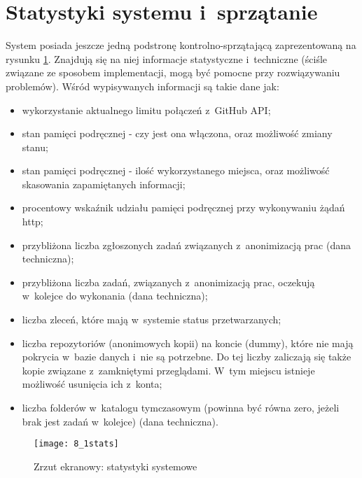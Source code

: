 \section{Statystyki systemu i~sprzątanie}
System posiada jeszcze jedną podstronę kontrolno-sprzątającą zaprezentowaną na rysunku \ref{obr81}. Znajdują się na niej informacje statystyczne i~techniczne (ściśle związane ze sposobem implementacji, mogą być pomocne przy rozwiązywaniu problemów). Wśród wypisywanych informacji są takie dane jak:
\begin{itemize}
    \item wykorzystanie aktualnego limitu połączeń z~GitHub API;
    \item stan pamięci podręcznej - czy jest ona włączona, oraz możliwość zmiany stanu;
    \item stan pamięci podręcznej - ilość wykorzystanego miejsca, oraz możliwość skasowania zapamiętanych informacji;
    \item procentowy wskaźnik udziału pamięci podręcznej przy wykonywaniu żądań http;
    \item przybliżona liczba zgłoszonych zadań związanych z~anonimizacją prac (dana techniczna);
    \item przybliżona liczba zadań, związanych z~anonimizacją prac, oczekują w~kolejce do wykonania (dana techniczna);
    \item liczba zleceń, które mają w~systemie status przetwarzanych;
    \item liczba repozytoriów (anonimowych kopii) na koncie  (dummy), które nie mają pokrycia w~bazie danych i~nie są potrzebne. Do tej liczby zaliczają się także kopie związane z~zamkniętymi przeglądami. W~tym miejscu istnieje możliwość usunięcia ich z~konta;
    \item liczba folderów w~katalogu tymczasowym (powinna być równa zero, jeżeli brak jest zadań w~kolejce) (dana techniczna).
\end{itemize}

\begin{figure}[!h]
    \texttt{[image: 8\_1stats]}
    \caption{Zrzut ekranowy: statystyki systemowe}
    \label{obr81}
\end{figure}



